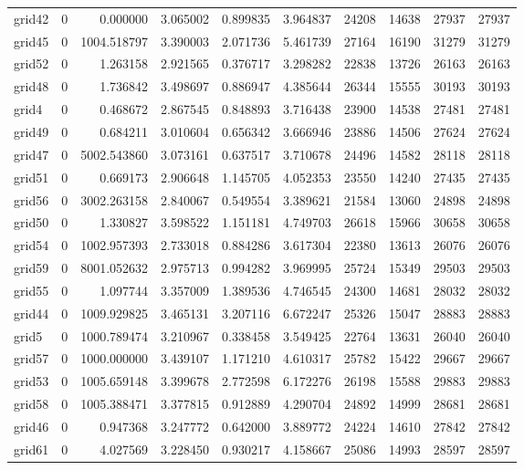 \begin{longtable}{|l|r|r|r|r|r|r|r|r|r|}
grid42 & 0 & 0.000000 & 3.065002 & 0.899835 & 3.964837 & 24208 & 14638 & 27937 & 27937 \\
grid45 & 0 & 1004.518797 & 3.390003 & 2.071736 & 5.461739 & 27164 & 16190 & 31279 & 31279 \\
grid52 & 0 & 1.263158 & 2.921565 & 0.376717 & 3.298282 & 22838 & 13726 & 26163 & 26163 \\
grid48 & 0 & 1.736842 & 3.498697 & 0.886947 & 4.385644 & 26344 & 15555 & 30193 & 30193 \\
grid4 & 0 & 0.468672 & 2.867545 & 0.848893 & 3.716438 & 23900 & 14538 & 27481 & 27481 \\
grid49 & 0 & 0.684211 & 3.010604 & 0.656342 & 3.666946 & 23886 & 14506 & 27624 & 27624 \\
grid47 & 0 & 5002.543860 & 3.073161 & 0.637517 & 3.710678 & 24496 & 14582 & 28118 & 28118 \\
grid51 & 0 & 0.669173 & 2.906648 & 1.145705 & 4.052353 & 23550 & 14240 & 27435 & 27435 \\
grid56 & 0 & 3002.263158 & 2.840067 & 0.549554 & 3.389621 & 21584 & 13060 & 24898 & 24898 \\
grid50 & 0 & 1.330827 & 3.598522 & 1.151181 & 4.749703 & 26618 & 15966 & 30658 & 30658 \\
grid54 & 0 & 1002.957393 & 2.733018 & 0.884286 & 3.617304 & 22380 & 13613 & 26076 & 26076 \\
grid59 & 0 & 8001.052632 & 2.975713 & 0.994282 & 3.969995 & 25724 & 15349 & 29503 & 29503 \\
grid55 & 0 & 1.097744 & 3.357009 & 1.389536 & 4.746545 & 24300 & 14681 & 28032 & 28032 \\
grid44 & 0 & 1009.929825 & 3.465131 & 3.207116 & 6.672247 & 25326 & 15047 & 28883 & 28883 \\
grid5 & 0 & 1000.789474 & 3.210967 & 0.338458 & 3.549425 & 22764 & 13631 & 26040 & 26040 \\
grid57 & 0 & 1000.000000 & 3.439107 & 1.171210 & 4.610317 & 25782 & 15422 & 29667 & 29667 \\
grid53 & 0 & 1005.659148 & 3.399678 & 2.772598 & 6.172276 & 26198 & 15588 & 29883 & 29883 \\
grid58 & 0 & 1005.388471 & 3.377815 & 0.912889 & 4.290704 & 24892 & 14999 & 28681 & 28681 \\
grid46 & 0 & 0.947368 & 3.247772 & 0.642000 & 3.889772 & 24224 & 14610 & 27842 & 27842 \\
grid61 & 0 & 4.027569 & 3.228450 & 0.930217 & 4.158667 & 25086 & 14993 & 28597 & 28597 \\

\end{longtable}
